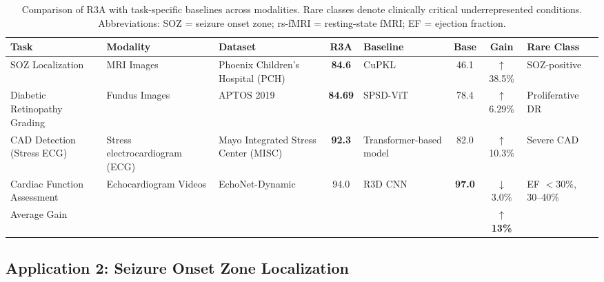 \documentclass{article}
\begin{document}
\begin{table}[h]
\centering
\scriptsize
\setlength{\tabcolsep}{4pt}
\renewcommand{\arraystretch}{1.05}
\caption{Comparison of R3A with task-specific baselines across modalities. Rare classes denote clinically critical underrepresented conditions. 
Abbreviations: SOZ = seizure onset zone; rs-fMRI = resting-state fMRI; EF = ejection fraction.}
\label{table3}

\begin{tabular}{
p{2.2cm}
p{1.5cm}
p{2.5cm}
c
p{1.8cm}
c
c
p{1.8cm}
}
\toprule
\textbf{Task} & \textbf{Modality} & \textbf{Dataset} & \textbf{R3A} & \textbf{Baseline} & \textbf{Base} & \textbf{Gain} & \textbf{Rare Class} \\
\midrule

\rowcolor[gray]{0.95}
SOZ Localization
& MRI Images
& Phoenix Children’s Hospital (PCH)~\cite{kamboj2024expertTAI}
& \textbf{84.6}
& CuPKL~\cite{kamboj2024expertTAI}
& 46.1
& $\uparrow$ 38.5\%
& SOZ-positive
\\

Diabetic Retinopathy Grading
& Fundus Images
& APTOS 2019~\cite{kauppi2019}
& \textbf{84.69}
& SPSD-ViT~\cite{Galappaththige2024}
& 78.4
& $\uparrow$ 6.29\%
& Proliferative DR
\\

\rowcolor[gray]{0.95}
CAD Detection (Stress ECG)
& Stress electrocardiogram (ECG)
& Mayo Integrated Stress Center (MISC)~\cite{Banerjee2025StressECG}
& \textbf{92.3}
& Transformer-based model~\cite{Banerjee2025StressECG}
& 82.0
& $\uparrow$ 10.3\%
& Severe CAD
\\

Cardiac Function Assessment
& Echocardiogram Videos
& EchoNet-Dynamic~\cite{EchoNetDynamic,StanfordEchoNet}
& 94.0
& R3D CNN~\cite{EchoNetDynamic}
& \textbf{97.0}
& $\downarrow$ 3.0\%
& EF $<30\%$, 30--40\%
\\
\midrule
\rowcolor[gray]{0.95}
Average Gain
&
&
&
&
&
& $\uparrow$ \textbf{13\%}
&
\\

\bottomrule
\end{tabular}
\end{table}

\subsection{Application 2: Seizure Onset Zone Localization}
\end{document}
